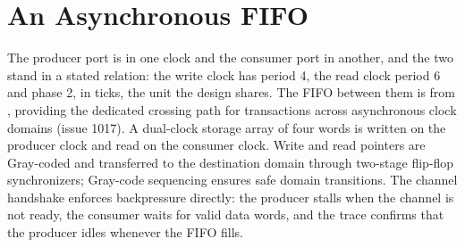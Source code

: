 \section{An Asynchronous FIFO}
\label{sec:x-fifo}

The producer port is in one clock and the consumer port in another,
and the two stand in a stated relation: the write clock has period 4,
the read clock period 6 and phase 2, in ticks, the unit the design
shares.
The FIFO between them is  from , providing
the dedicated crossing path for transactions across asynchronous clock domains
(issue 1017). A dual-clock storage array of four words is written on the
producer clock and read on the consumer clock. Write and read pointers are
Gray-coded and transferred to the destination domain through two-stage
flip-flop synchronizers; Gray-code sequencing ensures safe domain transitions.
The channel handshake enforces backpressure directly: the producer stalls
when the channel is not ready, the consumer waits for valid data words, and
the trace confirms that the producer idles whenever the FIFO fills.




